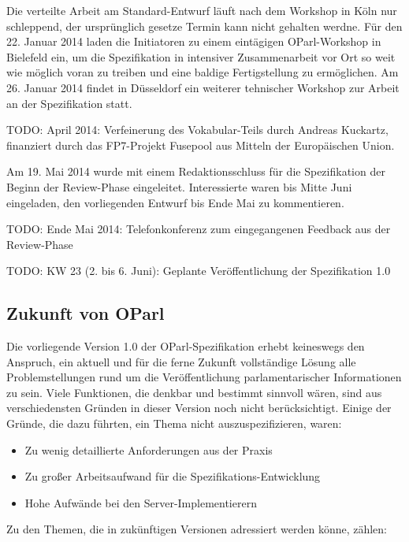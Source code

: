 \documentclass[,a4paper]{article}
\begin{document}
Die verteilte Arbeit am Standard-Entwurf läuft nach dem Workshop in Köln
nur schleppend, der ursprünglich gesetze Termin kann nicht gehalten
werdne. Für den 22. Januar 2014 laden die Initiatoren zu einem
eintägigen OParl-Workshop in Bielefeld ein, um die Spezifikation in
intensiver Zusammenarbeit vor Ort so weit wie möglich voran zu treiben
und eine baldige Fertigstellung zu ermöglichen. Am 26. Januar 2014
findet in Düsseldorf ein weiterer tehnischer Workshop zur Arbeit an der
Spezifikation statt.

TODO: April 2014: Verfeinerung des Vokabular-Teils durch Andreas
Kuckartz, finanziert durch das FP7-Projekt Fusepool aus Mitteln der
Europäischen Union.

Am 19. Mai 2014 wurde mit einem Redaktionsschluss für die Spezifikation
der Beginn der Review-Phase eingeleitet. Interessierte waren bis Mitte
Juni eingeladen, den vorliegenden Entwurf bis Ende Mai zu kommentieren.

TODO: Ende Mai 2014: Telefonkonferenz zum eingegangenen Feedback aus der
Review-Phase

TODO: KW 23 (2. bis 6. Juni): Geplante Veröffentlichung der
Spezifikation 1.0

\subsection{Zukunft von OParl}\label{zukunft-von-oparl}

Die vorliegende Version 1.0 der OParl-Spezifikation erhebt keineswegs
den Anspruch, ein aktuell und für die ferne Zukunft vollständige Lösung
alle Problemstellungen rund um die Veröffentlichung parlamentarischer
Informationen zu sein. Viele Funktionen, die denkbar und bestimmt
sinnvoll wären, sind aus verschiedensten Gründen in dieser Version noch
nicht berücksichtigt. Einige der Gründe, die dazu führten, ein Thema
nicht auszuspezifizieren, waren:

\begin{itemize}
\itemsep1pt\parskip0pt
\item
  Zu wenig detaillierte Anforderungen aus der Praxis
\item
  Zu großer Arbeitsaufwand für die Spezifikations-Entwicklung
\item
  Hohe Aufwände bei den Server-Implementierern
\end{itemize}

Zu den Themen, die in zukünftigen Versionen adressiert werden könne,
zählen:
\end{document}
